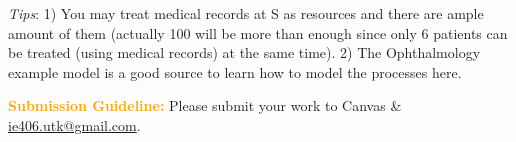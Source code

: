 \documentclass{article}
\begin{document}
\textit{Tips}: 1) You may treat medical records at S as resources and there are ample amount of them (actually 100 will be more than enough since only 6 patients can be treated (using medical records) at the same time). 2) The Ophthalmology example model is a good source to learn how to model the processes here. \\

\vskip 0.1in

\vskip 0.15in
\textcolor{orange}{\bf Submission Guideline:} Please submit your work to Canvas \& \url{ie406.utk@gmail.com}. 
\end{document}
